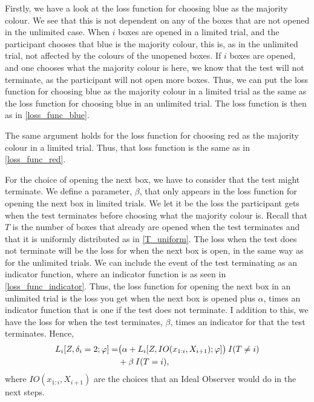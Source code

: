 Firstly, we have a look at the loss function for choosing blue as the majority colour. We see that this is not dependent on any of the boxes that are not opened in the unlimited case. When $i$ boxes are opened in a limited trial, and the participant chooses that blue is the majority colour, this is, as in the unlimited trial, not affected by the colours of the unopened boxes. If $i$ boxes are opened, and one chooses what the majority colour is here, we know that the test will not terminate, as the participant will not open more boxes. Thus, we can put the loss function for choosing blue as the majority colour in a limited trial as the same as the loss function for choosing blue in an unlimited trial. The loss function is then as in \eqref{loss_func_blue}.

The same argument holds for the loss function for choosing red as the majority colour in a limited trial. Thus, that loss function is the same as in \eqref{loss_func_red}.

For the choice of opening the next box, we have to consider that the test might terminate. 
We define a parameter, $\beta$, that only appears in the loss function for opening the next box in limited trials. 
We let it be the loss the participant gets when the test terminates before choosing what the majority colour is.
Recall that $T$ is the number of boxes that already are opened when the test terminates and that it is uniformly distributed as in \eqref{T_uniform}. The loss when the test does not terminate will be the loss for when the next box is open, in the same way as for the unlimited trials. We can include the event of the test terminating as an indicator function, where an indicator function is as seen in \eqref{loss_func_indicator}. Thus, the loss function for opening the next box in an unlimited trial is the loss you get when the next box is opened plus $\alpha$, times an indicator function that is one if the test does not terminate. I addition to this, we have the loss for when the test terminates, $\beta$, times an indicator for that the test terminates. Hence,
\begin{equation}
\label{loss_func_2_limited}
    \begin{aligned}
        L_i[Z,\delta_i=2;\varphi] 
        =& \big( \alpha + L_i[Z,IO(x_{1:i},X_{i+1});\varphi] \big) \: I(T\neq i) \\
        &+ \beta \: I(T=i),
    \end{aligned}
\end{equation}
where $IO(x_{1:i},X_{i+1})$ are the choices that an Ideal Observer would do in the next steps. 

